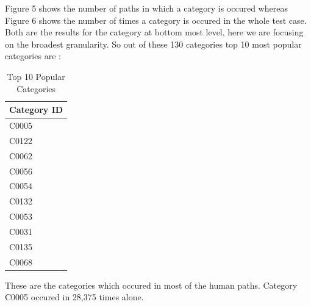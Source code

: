 \documentclass[12pt]{article}
\begin{document}
Figure 5 shows the number of paths in which a category is occured whereas Figure 6 shows the number of times a category is occured in the whole test case. Both are the results for the category at bottom most level, here we are focusing on the broadest granularity. So out of these 130 categories top 10 most popular categories are : 
\begin{table}[h]
\centering
\begin{tabular}{|l|}
\hline
Category ID \\ \hline
C0005       \\
C0122       \\
C0062       \\
C0056       \\
C0054       \\
C0132       \\
C0053       \\
C0031       \\
C0135       \\
C0068      	\\ \hline	
\end{tabular}
\caption{Top 10 Popular Categories}
\end{table}

These are the categories which occured in most of the human paths. Category C0005 occured in 28,375 times alone. 
\pagebreak
\end{document}
